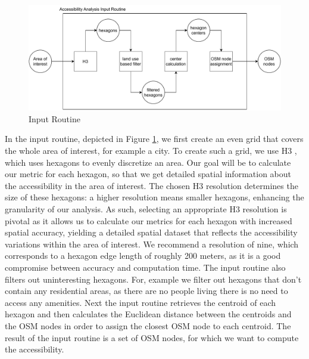 \begin{figure}
    \centering
    \includegraphics[scale=0.60]{Figures/method/input_routine}
    \caption{Input Routine}
    \label{fig:input_routine}
\end{figure}
In the input routine, depicted in Figure \ref{fig:input_routine}, we first create an even grid that covers the whole area of interest, for example a city.
To create such a grid, we use H3 , which uses hexagons to evenly discretize an area.
Our goal will be to calculate our metric for each hexagon, so that we get detailed spatial information about the accessibility in the area of interest.
The chosen H3 resolution determines the size of these hexagons: a higher resolution means smaller hexagons, enhancing the granularity of our analysis. 
As such, selecting an appropriate H3 resolution is pivotal as it allows us to calculate our metrics for each hexagon with increased spatial accuracy, yielding a detailed spatial dataset that reflects the accessibility variations within the area of interest.
We recommend a resolution of nine, which corresponds to a hexagon edge length of roughly 200 meters, as it is a good compromise between accuracy and computation time.
The input routine also filters out uninteresting hexagons.
For, example we filter out hexagons that don't contain any residential areas, as there are no people living there is no need to access any amenities.
Next the input routine retrieves the centroid of each hexagon and then calculates the Euclidean distance between the centroids and the OSM nodes in order to assign the closest OSM node to each centroid.
The result of the input routine is a set of OSM nodes, for which we want to compute the accessibility.



